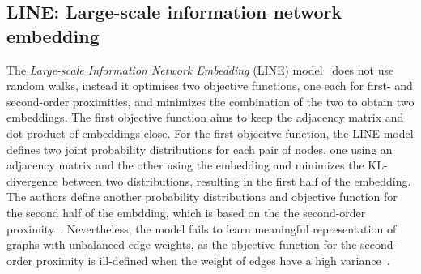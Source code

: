 \subsection{LINE: Large-scale information network embedding}
\label{subsec:LINE}
The \emph{Large-scale Information Network Embedding} (LINE) model~ does not use random walks, instead it optimises two objective functions, one each for first- and second-order proximities, and minimizes the combination of the two to obtain two embeddings. The first objective function aims to keep the adjacency matrix and dot product of embeddings close. For the first objecitve function, the LINE model defines two joint probability distributions for each pair of nodes, one using an adjacency matrix and the other using the embedding and minimizes the KL-divergence between two distributions, resulting in the first half of the embedding. The authors define another probability distributions and objective function for the second half of the embdding, which is based on the the second-order proximity~. Nevertheless, the model fails to learn meaningful representation of graphs with unbalanced edge weights, as the objective function for the second-order proximity is ill-defined when the weight of edges have a high variance~.
